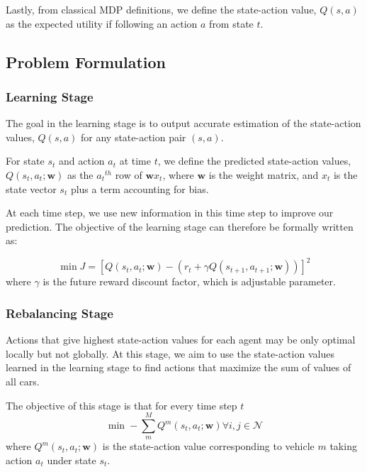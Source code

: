 \documentclass[letterpaper, 10 pt, conference]{ieeeconf}  %
\begin{document}
Lastly, from classical MDP definitions, we define the state-action value, $Q(s,a)$ as the expected utility if following an action $a$ from state $t$.

\subsection{Problem Formulation}
\subsubsection{Learning Stage}
The goal in the learning stage is to output accurate estimation of the state-action values, $Q(s,a)$ for any state-action pair $(s,a)$.

For state $s_t$ and action $a_t$ at time $t$, we define the predicted state-action values, $Q(s_t,a_t;\textbf{w})$ as the ${a_t}^{th}$ row of $\textbf{w}x_t$,
where $\textbf{w}$ is the weight matrix, and $x_t$ is the state vector $s_t$ plus a term accounting for bias. 

At each time step, we use new information in this time step to improve our prediction. The objective of the learning stage can therefore be formally written as:

\begin{equation}
    \min J = [Q(s_t,a_t;\textbf{w}) - (r_t+\gamma  Q(s_{t+1},a_{t+1};\textbf{w}))]^2
\end{equation}
where $\gamma$ is the future reward discount factor, which is adjustable parameter.\\


\subsubsection{Rebalancing Stage}
Actions that give highest state-action values for each agent may be only optimal locally but not globally. At this stage, we aim to use the state-action values learned in the learning stage to find actions that maximize the sum of values of all cars. 

The objective of this stage is that for every time step $t$
\begin{equation}
        \min -\sum_m^M Q^m(s_t,a_t;\textbf{w})\forall i,j\in \mathcal{N}
\end{equation}
where $Q^m(s_t,a_t;\textbf{w})$ is the state-action value corresponding to vehicle $m$ taking action $a_t$ under state $s_t$. 
\end{document}
